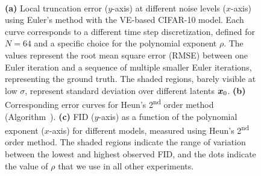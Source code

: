 {\begin{figure}[t]
{
}\\\hfill%
\hfill%
\hfill%
\hfill%
\caption{\label{fig:OdePlotExp}%
\textbf{(a)}
Local truncation error ($y$-axis) at different noise levels ($x$-axis) using Euler's method with the VE-based CIFAR-10 model.
Each curve corresponds to a different time step discretization, defined for $N=64$ and a specific choice for the polynomial exponent $\rho$.
The values represent the root mean square error (RMSE) between one Euler iteration and a sequence of multiple smaller Euler iterations, representing the ground truth.
The shaded regions, barely visible at low $\sigma$, represent standard deviation over different latents $\boldsymbol{x}_0$.
\textbf{(b)}
Corresponding error curves for Heun's 2\textsuperscript{nd} order method (Algorithm~).
\textbf{(c)}
FID ($y$-axis) as a function of the polynomial exponent ($x$-axis) for different models, measured using Heun's 2\textsuperscript{nd} order method.
The shaded regions indicate the range of variation between the lowest and highest observed FID, and the dots indicate the value of $\rho$ that we use in all other experiments.
}
\end{figure}
}

